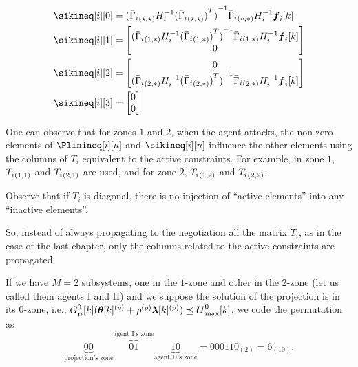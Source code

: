 \documentclass[../main.tex]{subfiles}
\begin{document}
\begin{align}
  \sikineq[i][0]&={{(\linearcoefiineqnonzero)}^{-1}}\elem[*,*]{\bar{\Gamma}_{i}}H_{i}^{-1}\vec{f}_{i}[k]\\
  \sikineq[i][1]&= \left[
                  \begin{matrix}
                    {{(\linearcoefiineqnonzero[1,*])}^{-1}}\elem[1,*]{\bar{\Gamma}_{i}}H_{i}^{-1}\vec{f}_{i}[k]\\
                    0
                  \end{matrix}
  \right]\\
  \sikineq[i][2]&=\left[
                  \begin{matrix}
                    0\\
                    {{(\linearcoefiineqnonzero[2,*])}^{-1}}\elem[2,*]{\bar{\Gamma}_{i}}H_{i}^{-1}\vec{f}_{i}[k]\\
                  \end{matrix}
  \right]\\
  \sikineq[i][3]&= \left[
                  \begin{matrix}
                    0\\
                    0
                  \end{matrix}
  \right]
\end{align}

One can observe that for zones $1$ and $2$, when the agent attacks, the non-zero elements of $\Plinineq[i][n]$ and $\sikineq[i][n]$ influence the other elements using the columns of $T_{i}$ equivalent to the active constraints.
For example, in zone $1$, $\elem[1,1]{T_{i}}$ and $\elem[2,1]{T_{i}}$ are used, and for zone $2$, $\elem[1,2]{T_{i}}$ and $\elem[2,2]{T_{i}}$.
\begin{remark}
  Observe that if $T_{i}$ is diagonal, there is no injection of ``active elements'' into any ``inactive elements''.
\end{remark}

So, instead of always propagating to the negotiation all the matrix $T_{i}$, as in the case of the last chapter, only the columns related to the active constraints are propagated.

If we have $M=2$ subsystems, one in the $1$-zone and other in the $2$-zone (let us called them agents I and II) and we suppose the solution of the projection is in its $0$-zone, i.e., ${G_{\vec{\mu}}^{0}[k](\vec{\theta}[k]\p+\rho\p\vec{\lambda}[k]\p) \preceq \vec{U}_{\max}^{0}[k]}$, we code the permutation as
\begin{equation}
  \underbrace{00}_{\text{projection's zone}}\overbrace{01}^{\text{agent I`s zone}}\underbrace{10}_{\text{agent II's zone}} = 000110_{(2)}=6_{(10)}.
\end{equation}
\end{document}
